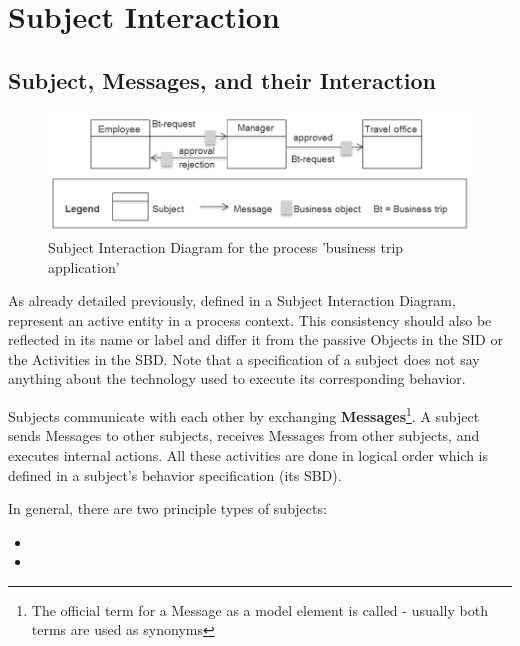 \section{Subject Interaction}
\label{sec:subjectInteraction}

\subsection{Subject, Messages, and their Interaction}
\label{sec:Subject}


\begin{figure}[htbp]
	\centering
	\includegraphics[width=14cm]{Figures/Ontology/SubjectInteraction/Beispiel-Subject-Interaction.png}
	\caption[Subject Interaction Diagram]{Subject Interaction Diagram for the process 'business trip application'}
	\label{fig:beispiel-SubjectInteraction}
\end{figure}

As already detailed previously,  defined in a Subject Interaction Diagram, represent an active entity in a process context. This consistency should also be reflected in its name or label and differ it from the passive Objects in the SID or the Activities in the SBD. Note that a specification of a subject does not say anything about the technology used to execute its corresponding behavior. 

Subjects communicate with each other by exchanging \textbf{Messages}\footnote{The official term for a Message as a model element is called  - usually both terms are used as synonyms}. A subject sends Messages to other subjects, receives Messages from other subjects, and executes internal actions. All these activities are done in logical order which is defined in a subject's behavior specification (its SBD).

In general, there are two principle types of subjects:

\begin{itemize}
	\item {}
	\item {}
\end{itemize}


